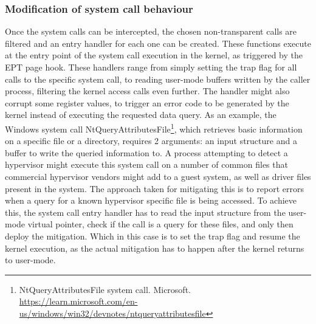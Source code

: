 \subsubsection{Modification of system call behaviour}
Once the system calls can be intercepted, the chosen non-transparent calls are filtered and an entry handler for each one can be created. 
These functions execute at the entry point of the system call execution in the kernel, as triggered by the EPT page hook. 
These handlers range from simply setting the trap flag for all calls to the specific system call, to reading user-mode buffers written by the caller process, 
filtering the kernel access calls even further. The handler might also corrupt some register values, to trigger an error code to be generated by the kernel 
instead of executing the requested data query. As an example, the Windows system call NtQueryAttributesFile\footnote{NtQueryAttributesFile system call. Microsoft. \url{https://learn.microsoft.com/en-us/windows/win32/devnotes/ntqueryattributesfile}}, 
which retrieves basic information on a specific file or a directory, requires 2 arguments: an input structure and a buffer to write the queried information to.
A process attempting to detect a hypervisor might execute this system call on a number of common files that commercial hypervisor vendors might add to a guest system, 
as well as driver files present in the system. The approach taken for mitigating this is to report errors when a query for a known hypervisor specific file is being accessed. 
To achieve this, the system call entry handler has to read the input structure from the user-mode virtual pointer, check if the call is a query for these  files, 
and only then deploy the mitigation. Which in this case is to set the trap flag and resume the kernel execution, 
as the actual mitigation has to happen after the kernel returns to user-mode.

